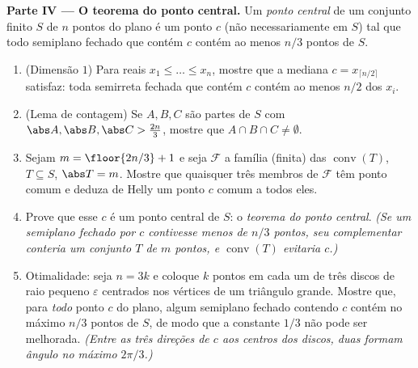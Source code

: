 \begin{problem}
\medskip
\noindent\textbf{Parte IV --- O teorema do ponto central.} Um
\emph{ponto central} de um conjunto finito $S$ de $n$ pontos do
plano é um ponto $c$ (não necessariamente em $S$) tal que todo
semiplano fechado que contém $c$ contém ao menos $n/3$
pontos de $S$.
\begin{enumerate}[resume]
  \item (Dimensão $1$) Para reais $x_1 \leq \dots \leq x_n$,
        mostre que a mediana $c = x_{\lceil n/2 \rceil}$
        satisfaz: toda semirreta fechada que contém $c$
        contém ao menos $n/2$ dos $x_i$.
  \item (Lema de contagem) Se $A, B, C$ são partes de $S$ com
        $\abs A, \abs B, \abs C > \tfrac{2n}3$, mostre que $A \cap
        B \cap C \neq \emptyset$.
  \item Sejam $m = \floor{2n/3} + 1$ e seja $\mathcal F$
        a família (finita) das 
        $\operatorname{conv}(T)$, $T \subseteq S$, $\abs T =
        m$. Mostre que quaisquer três membros de $\mathcal F$ têm
        ponto comum e deduza de Helly um ponto $c$
        comum a todos eles.
  \item Prove que esse $c$ é um ponto central de $S$: o
        \emph{teorema do ponto central}. \emph{(Se um
        semiplano fechado por $c$ contivesse menos de $n/3$
        pontos, seu complementar  conteria um conjunto $T$
        de $m$ pontos, e $\operatorname{conv}(T)$ evitaria
        $c$.)}
  \item Otimalidade: seja $n = 3k$ e coloque $k$ pontos em cada
        um de três discos de raio pequeno $\varepsilon$ centrados
        nos vértices de um triângulo grande. Mostre que, para
        \emph{todo} ponto $c$ do plano, algum semiplano
        fechado contendo $c$ contém no máximo $n/3$
        pontos de $S$, de modo que a constante $1/3$ não pode ser
        melhorada. \emph{(Entre as três direções de $c$
        aos centros dos discos, duas formam ângulo no máximo
        $2\pi/3$.)}
\end{enumerate}


\end{problem}
